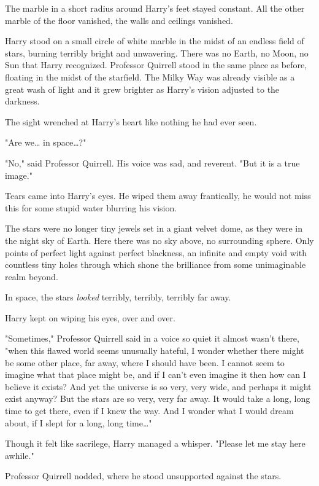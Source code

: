 The marble in a short radius around Harry's feet stayed constant. All the other 
marble of the floor vanished, the walls and ceilings vanished.

Harry stood on a small circle of white marble in the midst of an endless field 
of stars, burning terribly bright and unwavering. There was no Earth, no Moon, 
no Sun that Harry recognized. Professor Quirrell stood in the same place as 
before, floating in the midst of the starfield. The Milky Way was already 
visible as a great wash of light and it grew brighter as Harry's vision 
adjusted to the darkness.

The sight wrenched at Harry's heart like nothing he had ever seen.

"Are we{\ldots} in space{\ldots}?"

"No," said Professor Quirrell. His voice was sad, and reverent. "But it is a 
true image."

Tears came into Harry's eyes. He wiped them away frantically, he would not miss 
this for some stupid water blurring his vision.

The stars were no longer tiny jewels set in a giant velvet dome, as they were 
in the night sky of Earth. Here there was no sky above, no surrounding sphere. 
Only points of perfect light against perfect blackness, an infinite and empty 
void with countless tiny holes through which shone the brilliance from some 
unimaginable realm beyond.

In space, the stars \emph{looked} terribly, terribly, terribly far away.

Harry kept on wiping his eyes, over and over.

"Sometimes," Professor Quirrell said in a voice so quiet it almost wasn't 
there, "when this flawed world seems unusually hateful, I wonder whether there 
might be some other place, far away, where I should have been. I cannot seem to 
imagine what that place might be, and if I can't even imagine it then how can I 
believe it exists? And yet the universe is so very, very wide, and perhaps it 
might exist anyway? But the stars are so very, very far away. It would take a 
long, long time to get there, even if I knew the way. And I wonder what I would 
dream about, if I slept for a long, long time{\ldots}"

Though it felt like sacrilege, Harry managed a whisper. "Please let me stay 
here awhile."

Professor Quirrell nodded, where he stood unsupported against the stars.

